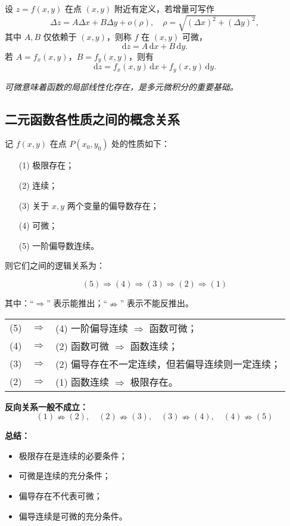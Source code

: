 设 $z=f(x,y)$ 在点 $(x,y)$ 附近有定义，若增量可写作
$$
    \Delta z = A\Delta x + B\Delta y + o(\rho),\quad \rho=\sqrt{(\Delta x)^2+(\Delta y)^2},
$$
其中 $A,B$ 仅依赖于 $(x,y)$，则称 $f$ 在 $(x,y)$ 可微，
$$
    \mathrm{d}z = A\,\mathrm{d}x + B\,\mathrm{d}y.
$$
若 $A=f_x(x,y)$，$B=f_y(x,y)$，则有
$$
    \mathrm{d}z = f_x(x,y)\,\mathrm{d}x + f_y(x,y)\,\mathrm{d}y.
$$

\textit{可微意味着函数的局部线性化存在，是多元微积分的重要基础。}

\subsection{二元函数各性质之间的概念关系}

记 $f(x, y)$ 在点 $P(x_0, y_0)$ 处的性质如下：
\begin{enumerate}
    \item[(1)] 极限存在；
    \item[(2)] 连续；
    \item[(3)] 关于 $x, y$ 两个变量的偏导数存在；
    \item[(4)] 可微；
    \item[(5)] 一阶偏导数连续。
\end{enumerate}

则它们之间的逻辑关系为：

\[
    \boxed{
        (5) \Rightarrow (4) \Rightarrow (3) \Rightarrow (2) \Rightarrow (1)
    }
\]

其中：“$\Rightarrow$” 表示能推出；“$\nRightarrow$” 表示不能反推出。


\begin{center}
    \begin{tabular}{ccl}
        (5) & $\Rightarrow$ & (4) \quad 一阶偏导连续 $\Rightarrow$ 函数可微； \\
        (4) & $\Rightarrow$ & (2) \quad 函数可微 $\Rightarrow$ 函数连续；   \\
        (3) & $\Rightarrow$ & (2) \quad 偏导存在不一定连续，但若偏导连续则一定连续；     \\
        (2) & $\Rightarrow$ & (1) \quad 函数连续 $\Rightarrow$ 极限存在。
    \end{tabular}
\end{center}

\textbf{反向关系一般不成立：}
\[
    (1) \nRightarrow (2),\quad (2) \nRightarrow (3),\quad (3) \nRightarrow (4),\quad (4) \nRightarrow (5)
\]

\textbf{总结：}
\begin{itemize}
    \item 极限存在是连续的必要条件；
    \item 可微是连续的充分条件；
    \item 偏导存在不代表可微；
    \item 偏导连续是可微的充分条件。
\end{itemize}

